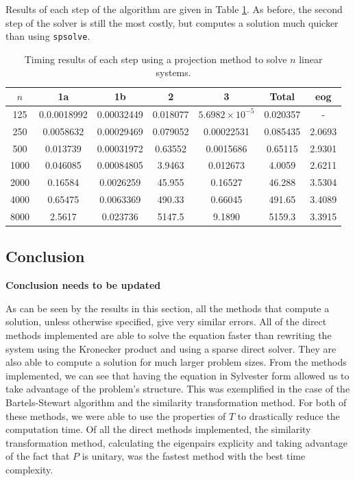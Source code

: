 \documentclass[11pt]{article}
\numberwithin{equation}{section}
\begin{document}
Results of each step of the algorithm are given in Table \ref{table:shifted it steps}. As before, the second step of the solver is still the most costly, but computes a solution much quicker than using \texttt{spsolve}.

\begin{table}[H]
\centering
\begin{tabular}{|c|c|c|c|c|c|c|}
\hline
$n$ & 1a & 1b & 2 & 3 & Total & eog \\
\hline
125 & 0.0.0018992 & 0.00032449 & 0.018077 & $5.6982 \times 10^{-5}$ & 0.020357 & - \\
250 & 0.0058632 & 0.00029469 & 0.079052 & 0.00022531 & 0.085435 & 2.0693 \\
500 & 0.013739 & 0.00031972 & 0.63552 & 0.0015686 & 0.65115 & 2.9301 \\
1000 & 0.046085 & 0.00084805 & 3.9463 & 0.012673 & 4.0059 & 2.6211 \\
2000 & 0.16584 & 0.0026259 & 45.955 & 0.16527 & 46.288 & 3.5304 \\
4000 & 0.65475 & 0.0063369 & 490.33 & 0.66045 & 491.65 & 3.4089 \\
8000 & 2.5617 & 0.023736 & 5147.5 & 9.1890 & 5159.3 & 3.3915 \\
\hline
\end{tabular}
\captionsetup{justification=centering}
\caption{Timing results of each step using a projection method to solve $n$ linear systems.}
\label{table:shifted it steps}
\end{table}

\subsection{Conclusion}
\textbf{Conclusion needs to be updated}

As can be seen by the results in this section, all the methods that compute a solution, unless otherwise specified, give very similar errors. All of the direct methods implemented are able to solve the equation faster than rewriting the system using the Kronecker product and using a sparse direct solver. They are also able to compute a solution for much larger problem sizes. From the methods implemented, we can see that having the equation in Sylvester form allowed us to take advantage of the problem's structure. This was exemplified in the case of the Bartels-Stewart algorithm and the similarity transformation method. For both of these methods, we were able to use the properties of $T$ to drastically reduce the computation time. Of all the direct methods implemented, the similarity transformation method, calculating the eigenpairs explicity and taking advantage of the fact that $P$ is unitary, was the fastest method with the best time complexity. 
\end{document}
